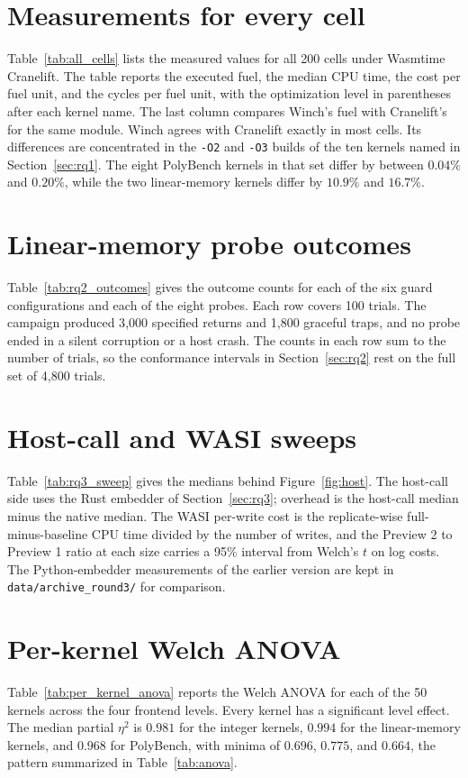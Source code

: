 \documentclass{ws-jcsc}
\begin{document}
\section{Measurements for every cell}\label{app:all_cells}
Table~\ref{tab:all_cells} lists the measured values for all 200 cells under Wasmtime Cranelift. The table reports the executed fuel, the median CPU time, the cost per fuel unit, and the cycles per fuel unit, with the optimization level in parentheses after each kernel name. The last column compares Winch's fuel with Cranelift's for the same module. Winch agrees with Cranelift exactly in most cells. Its differences are concentrated in the \texttt{-O2} and \texttt{-O3} builds of the ten kernels named in Section~\ref{sec:rq1}. The eight PolyBench kernels in that set differ by between $0.04\%$ and $0.20\%$, while the two linear-memory kernels differ by $10.9\%$ and $16.7\%$.



\section{Linear-memory probe outcomes}\label{app:rq2}
Table~\ref{tab:rq2_outcomes} gives the outcome counts for each of the six guard configurations and each of the eight probes. Each row covers 100 trials. The campaign produced 3{,}000 specified returns and 1{,}800 graceful traps, and no probe ended in a silent corruption or a host crash. The counts in each row sum to the number of trials, so the conformance intervals in Section~\ref{sec:rq2} rest on the full set of 4{,}800 trials.



\section{Host-call and WASI sweeps}\label{app:rq3}
Table~\ref{tab:rq3_sweep} gives the medians behind Figure~\ref{fig:host}. The host-call side uses the Rust embedder of Section~\ref{sec:rq3}; overhead is the host-call median minus the native median. The WASI per-write cost is the replicate-wise full-minus-baseline CPU time divided by the number of writes, and the Preview 2 to Preview 1 ratio at each size carries a 95\% interval from Welch's $t$ on log costs. The Python-embedder measurements of the earlier version are kept in \texttt{data/archive\_round3/} for comparison.



\section{Per-kernel Welch ANOVA}\label{app:anova}
Table~\ref{tab:per_kernel_anova} reports the Welch ANOVA for each of the 50 kernels across the four frontend levels. Every kernel has a significant level effect. The median partial $\eta^2$ is $0.981$ for the integer kernels, $0.994$ for the linear-memory kernels, and $0.968$ for PolyBench, with minima of $0.696$, $0.775$, and $0.664$, the pattern summarized in Table~\ref{tab:anova}.


\end{document}
